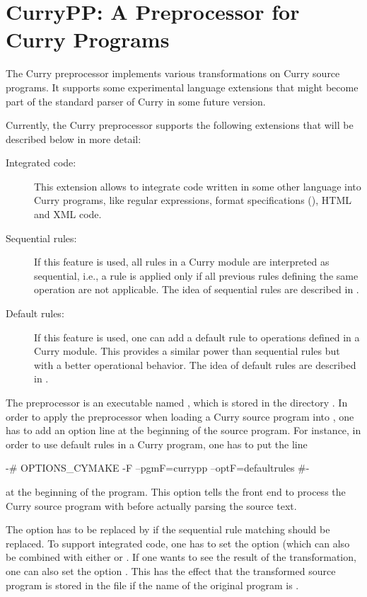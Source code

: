 \section{CurryPP: A Preprocessor for Curry Programs}

The Curry preprocessor 
implements
various transformations on Curry source programs.
It supports some experimental language extensions
that might become part of the standard parser of Curry
in some future version.

Currently, the Curry preprocessor
supports the following extensions that will be described below in more detail:

\begin{description}
\item[Integrated code:]
This extension allows to integrate
code written in some other language into Curry programs,
like regular expressions, format specifications (),
HTML and XML code.
\item[Sequential rules:]
If this feature is used, all rules in a Curry module are
interpreted as sequential, i.e., a rule is applied only
if all previous rules defining the same operation are not applicable.
The idea of sequential rules are described in \cite{AntoyHanus14}.
\item[Default rules:]
If this feature is used, one can add a default rule
to operations defined in a Curry module.
This provides a similar power than sequential rules
but with a better operational behavior.
The idea of default rules are described in \cite{AntoyHanus16PADL}.
\end{description}
%
The preprocessor is an executable named ,
which is stored in the directory .
In order to apply the preprocessor when loading a Curry source
program into \CYS, one has to add an option line
at the beginning of the source program.
For instance, in order to use default rules in a Curry program,
one has to put the line
\begin{curry}
{-# OPTIONS_CYMAKE -F --pgmF=currypp --optF=defaultrules #-}
\end{curry}
at the beginning of the program.
This option tells the \CYS front end to process the Curry source program
with  before actually parsing the source text.

The option  has to be replaced by
 if the sequential rule matching should be replaced.
To support integrated code, one has to set the option
 (which can also be combined with
either  or .
If one wants to see the result of the transformation, one can
also set the option . This has the effect that the
transformed source program is stored in the file
 if the name of the original program
is .

